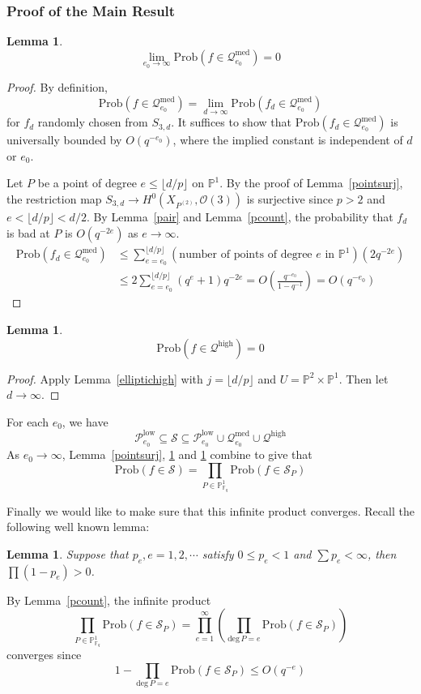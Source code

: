 \documentclass[12pt]{article}
\theoremstyle{plain}
\newtheorem{lemma}[equation]{Lemma}
\theoremstyle{definition}
\newcommand{\IF}{\mathbb{F}}
\newcommand{\IP}{\mathbb{P}}
\newcommand{\sO}{\mathcal{O}}
\newcommand{\sP}{\mathcal{P}}
\newcommand{\sQ}{\mathcal{Q}}
\newcommand{\sS}{\mathcal{S}}
\renewcommand{\deg}{\mathrm{deg}\,}
\newcommand{\<}{\langle}
\renewcommand{\>}{\rangle}
\newcommand{\Prob}{\mathrm{Prob}}
\newcommand{\fl}[1]{\lfloor #1 \rfloor}
\begin{document}
\subsubsection{Proof of the Main Result}
\begin{lemma}
\label{ellipticmed}
$$ \lim_{e_0 \to \infty} \Prob( f \in \sQ_{e_0}^{\mathrm{med}}) = 0 $$
\end{lemma}
\begin{proof}
By definition, 
$$ \Prob( f \in  \sQ_{e_0}^{\mathrm{med}}) = \lim_{d \to \infty} \Prob(f_d \in \sQ_{e_0}^{\mathrm{med}})$$
for $f_d$ randomly chosen from $S_{3, d}$. It suffices to show that $\Prob(f_d \in \sQ_{e_0}^{\mathrm{med}})$ is universally bounded by $O(q^{-e_0})$, where the implied constant is independent of $d$ or $e_0$. 

Let $P$ be a point of degree $e \le \lfloor d/p \rfloor$ on $\IP^1$. By the proof of Lemma~\ref{pointsurj}, the restriction map $S_{3, d} \to H^0(X_{P^{(2)}}, \sO(3))$ is surjective since $p > 2$ and $e < \lfloor d/p \rfloor < d/2$. By Lemma~\ref{pair} and Lemma~\ref{pcount}, the probability that $f_d$ is bad at $P$ is $O(q^{-2e})$ as $e \to \infty$. 
\begin{align*}
\Prob(f_d \in \sQ_{e_0}^{\mathrm{med}}) &\le \sum_{e = e_0}^{\lfloor d/p \rfloor} (\text{number of points of degree $e$ in $\IP^1$})(2q^{-2e}) \\
&\le 2 \sum_{e = e_0}^{\lfloor d/p \rfloor}(q^{e} + 1) q^{-2e} = O(\frac{q^{-e_0}}{1 - q^{-1}}) = O(q^{-e_0})
\end{align*} 
\end{proof}

\begin{lemma}
\label{elliptichighf}
$$ \Prob(f \in \sQ^{\mathrm{high}}) = 0 $$
\end{lemma}
\begin{proof}
Apply Lemma~\ref{elliptichigh} with $j = \fl{d/p}$ and $U = \IP^2 \times \IP^1$. Then let $d \to \infty$. 
\end{proof}

For each $e_0$, we have 
$$ \sP_{e_0}^{\mathrm{low}} \subseteq \sS \subseteq \sP_{e_0}^{\mathrm{low}} \cup \sQ_{e_0}^{\mathrm{med}} \cup \sQ^{\mathrm{high}}$$
As $e_0 \to \infty$, Lemma~\ref{pointsurj}, \ref{ellipticmed} and \ref{elliptichighf} combine to give that 
$$ \Prob(f \in \sS) = \prod_{P \in \IP^1_{\IF_q}} \Prob( f \in \sS_P) $$

Finally we would like to make sure that this infinite product converges. Recall the following well known lemma:
\begin{lemma}
Suppose that $p_e, e = 1, 2, \cdots$ satisfy $0 \le p_e < 1$ and $\sum p_e < \infty$, then $\prod (1 - p_e) > 0$. 
\end{lemma}
By Lemma~\ref{pcount}, the infinite product 
$$ \prod_{P \in \IP^1_{\IF_q}} \Prob( f \in \sS_P) = \prod_{e = 1}^\infty (\prod_{\deg P = e} \Prob(f \in \sS_P))$$
converges since 
$$ 1 - \prod_{\deg P = e} \Prob(f \in \sS_P) \le O(q^{-e})$$
\end{document}
